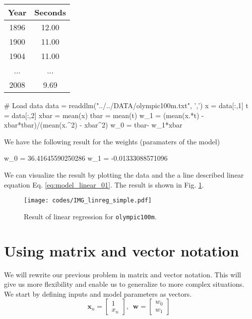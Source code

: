 \documentclass[a4paper,11pt]{article} %
\newcommand{\txtinline}[1]{\texttt{#1}}
\begin{document}
\begin{table}[H]
\begin{center}
\begin{tabular}{|c|c|}
\hline
Year & Seconds \\
\hline
1896 & 12.00 \\
1900 & 11.00 \\
1904 & 11.00 \\
...  & ...   \\
2008 & 9.69  \\
\hline
\end{tabular}
\end{center}
\end{table}


\begin{juliacode}
# Load data
data = readdlm("../../DATA/olympic100m.txt", ',')
x = data[:,1]
t = data[:,2]
xbar = mean(x)
tbar = mean(t)
w_1 = (mean(x.*t) - xbar*tbar)/(mean(x.^2) - xbar^2)
w_0 = tbar- w_1*xbar
\end{juliacode}

We have the following result for the weights (paramaters of the model)
\begin{textcode}
w_0 = 36.41645590250286
w_1 = -0.01333088571096
\end{textcode}

We can visualize the result by plotting the data and the a line described
linear equation Eq. \eqref{eq:model_linear_01}. The result is shown in
Fig. \ref{fig:linreg_01}.
\begin{figure}[H]
\begin{center}
\texttt{[image: codes/IMG\_linreg\_simple.pdf]}
\end{center}
\caption{Result of linear regression for \txtinline{olympic100m}.}
\label{fig:linreg_01}
\end{figure}


\section{Using matrix and vector notation}

We will rewrite our previous problem in matrix and vector notation. This will
give us more flexibility and enable us to generalize to more complex situations.
We start by defining inputs and model parameters as vectors.
\begin{equation*}
\mathbf{x}_{n} = \begin{bmatrix}
1 \\
x_{n}
\end{bmatrix}
,\,\,\,%
\mathbf{w} = \begin{bmatrix}
w_{0} \\
w_{1}
\end{bmatrix}
\end{equation*}
\end{document}
